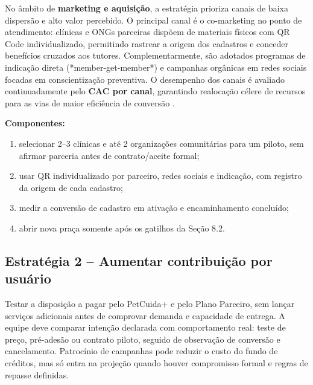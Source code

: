 No âmbito de \textbf{marketing e aquisição}, a estratégia prioriza canais de baixa dispersão e alto valor percebido. O principal canal é o co-marketing no ponto de atendimento: clínicas e ONGs parceiras dispõem de materiais físicos com QR Code individualizado, permitindo rastrear a origem dos cadastros e conceder benefícios cruzados aos tutores. Complementarmente, são adotados programas de indicação direta (*member-get-member*) e campanhas orgânicas em redes sociais focadas em conscientização preventiva. O desempenho dos canais é avaliado continuadamente pelo \textbf{CAC por canal}, garantindo realocação célere de recursos para as vias de maior eficiência de conversão \cite{kock2024}.

\textbf{Componentes:}
\begin{enumerate}[label=\alph*)]
\item selecionar 2--3 clínicas e até 2 organizações comunitárias para um piloto, sem afirmar parceria antes de contrato/aceite formal;
\item usar QR individualizado por parceiro, redes sociais e indicação, com registro da origem de cada cadastro;
\item medir a conversão de cadastro em ativação e encaminhamento concluído;
\item abrir nova praça somente após os gatilhos da Seção 8.2.
\end{enumerate}

\subsection{Estratégia 2 -- Aumentar contribuição por usuário}
Testar a disposição a pagar pelo PetCuida+ e pelo Plano Parceiro, sem lançar serviços adicionais antes de comprovar demanda e capacidade de entrega. A equipe deve comparar intenção declarada com comportamento real: teste de preço, pré-adesão ou contrato piloto, seguido de observação de conversão e cancelamento. Patrocínio de campanhas pode reduzir o custo do fundo de créditos, mas só entra na projeção quando houver compromisso formal e regras de repasse definidas.

